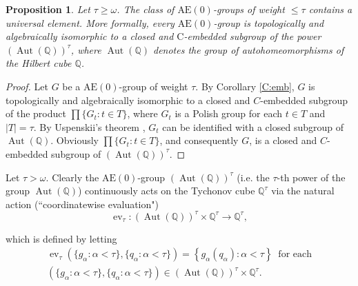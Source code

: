 \documentclass[12pt,draft]{amsart}
\theoremstyle{plain}
\newtheorem{pro}[thm]{Proposition}
\theoremstyle{definition}
\numberwithin{equation}{section}
\begin{document}
\begin{pro}\label{P:univ}
Let $\tau \geq \omega$. The class of $\text{AE}(0)$-groups of weight
$\leq \tau$ contains a universal element. More formally, every
$\text{AE}(0)$-group is topologically and algebraically isomorphic
to a closed and $\text{C}$-embedded subgroup of the power
$\left(\operatorname{Aut}({\mathbb Q})\right)^{\tau}$,
where $\operatorname{Aut}({\mathbb Q})$
denotes the group of autohomeomorphisms of the Hilbert cube ${\mathbb Q}$.
\end{pro}
\begin{proof}
Let $G$ be a $\text{AE}(0)$-group of weight $\tau$. By
Corollary \ref{C:emb}, $G$ is topologically and algebraically
isomorphic to a closed and $C$-embedded subgroup of the
product $\displaystyle \prod\{ G_{t} \colon t \in T\}$,
where $G_{t}$ is a Polish group for each $t \in T$ and $|T| = \tau$.
By Uspenskii's theorem \cite{usp86}, $G_{t}$ can be identified with a closed 
subgroup of $\operatorname{Aut}({\mathbb Q})$. Obviously
$\displaystyle \prod\{ G_{t} \colon t \in T\}$,
and consequently $G$, is a closed and
$C$-embedded subgroup of
$\left(\operatorname{Aut}({\mathbb Q})\right)^{\tau}$.
\end{proof}



Let $\tau > \omega$. Clearly the $\text{AE}(0)$-group
$\left(\operatorname{Aut}({\mathbb Q})\right)^{\tau}$ (i.e. the $\tau$-th power
of the group $\operatorname{Aut}({\mathbb Q})$)
continuously acts on the Tychonov cube ${\mathbb Q}^{\tau}$
via the natural action (``coordinatewise evaluation")
\[ \operatorname{ev}_{\tau} \colon \left(\operatorname{Aut}
({\mathbb Q})\right)^{\tau} \times
{\mathbb Q}^{\tau} \to {\mathbb Q}^{\tau} ,\]

\noindent which is defined by letting 
\begin{multline*}
\operatorname{ev}_{\tau}\left( \{ g_{\alpha} \colon \alpha < \tau \} ,
\{ q_{\alpha} \colon \alpha < \tau\}\right) =
\left\{ g_{\alpha}(q_{\alpha}) \colon \alpha < \tau \right\}
\;\;\text{for each}\\
 \left( \{ g_{\alpha} \colon \alpha < \tau \} ,
\{ q_{\alpha} \colon \alpha < \tau\}\right) \in
\left(\operatorname{Aut}({\mathbb Q})\right)^{\tau} \times
{\mathbb Q}^{\tau} .
\end{multline*}
\end{document}
